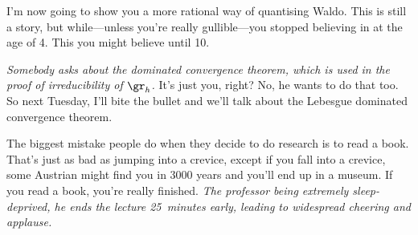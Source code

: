 \documentclass[10pt, a4paper, twoside]{lecturenotes}
\begin{document}
\begin{lecture}[date=2013-04-18]
I'm now going to show you a more rational way of quantising Waldo. This is still a story, but while---unless you're really gullible---you stopped believing in  at the age of 4. This you might believe until 10.

\emph{Somebody asks about the dominated convergence theorem, which is used in the proof of irreducibility of $\gr_h$.}
It's just you, right? No, he wants to do that too. So next Tuesday, I'll bite the bullet and we'll talk about the Lebesgue dominated convergence theorem.

The biggest mistake people do when they decide to do research is to read a book. That's just as bad as jumping into a crevice, except if you fall into a crevice, some Austrian might find you in 3000 years and you'll end up in a museum. If you read a book, you're really finished.
\emph{The professor being extremely sleep-deprived, he ends the lecture 25~minutes early, leading to widespread cheering and applause.}
\end{lecture}
\end{document}

